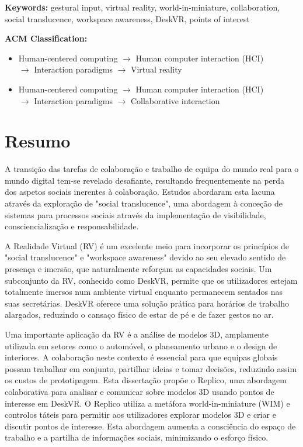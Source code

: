 \noindent\textbf{Keywords:} gestural input, virtual reality, world-in-miniature, collaboration, social translucence, workspace awareness, DeskVR, points of interest

\vspace{1em}

\noindent\textbf{ACM Classification:}

\begin{itemize}
    \item Human-centered computing $\rightarrow$ Human computer interaction (HCI) \\ $\rightarrow$ Interaction paradigms $\rightarrow$ Virtual reality 
    \item Human-centered computing $\rightarrow$ Human computer interaction (HCI) \\ $\rightarrow$ Interaction paradigms $\rightarrow$ Collaborative interaction
\end{itemize}

\chapter*{Resumo}

A transição das tarefas de colaboração e trabalho de equipa do mundo real para o mundo digital tem-se revelado desafiante, resultando frequentemente na perda dos aspetos sociais inerentes à colaboração. Estudos abordaram esta lacuna através da exploração de "social translucence", uma abordagem à conceção de sistemas para processos sociais através da implementação de visibilidade, consciencialização e responsabilidade.

A Realidade Virtual (RV) é um excelente meio para incorporar os princípios de "social translucence" e "workspace awareness" devido ao seu elevado sentido de presença e imersão, que naturalmente reforçam as capacidades sociais. Um subconjunto da RV, conhecido como DeskVR, permite que os utilizadores estejam totalmente imersos num ambiente virtual enquanto permanecem sentados nas suas secretárias. DeskVR oferece uma solução prática para horários de trabalho alargados, reduzindo o cansaço físico de estar de pé e de fazer gestos no ar.

Uma importante aplicação da RV é a análise de modelos 3D, amplamente utilizada em setores como o automóvel, o planeamento urbano e o design de interiores. A colaboração neste contexto é essencial para que equipas globais possam trabalhar em conjunto, partilhar ideias e tomar decisões, reduzindo assim os custos de prototipagem. Esta dissertação propõe o Replico, uma abordagem colaborativa para analisar e comunicar sobre modelos 3D usando pontos de interesse em DeskVR. O Replico utiliza a metáfora world-in-miniature (WIM) e controlos táteis para permitir aos utilizadores explorar modelos 3D e criar e discutir pontos de interesse. Esta abordagem aumenta a consciência do espaço de trabalho e a partilha de informações sociais, minimizando o esforço físico.

